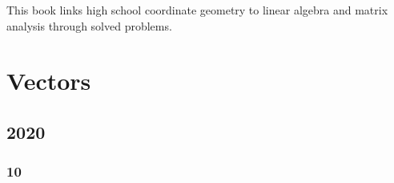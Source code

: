 \documentclass[11pt]{book}
\begin{document}

\setcounter{page}{1}

\begin{introduction}
This book links high school coordinate geometry to linear algebra and matrix analysis through solved problems.

\end{introduction}

\mainmatter
\chapter{Vectors}
\section{2020}
\subsection{10}

\end{document}
